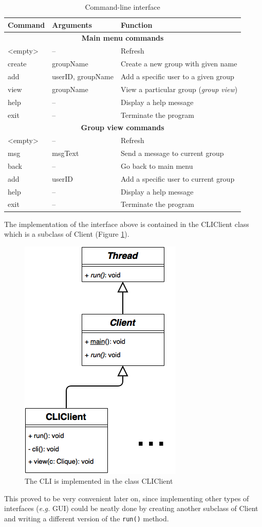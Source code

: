 \documentclass[a4paper, 12pt]{report}
\begin{document}
\begin{table}[H]
\centering
\begin{tabular*}{0.9\textwidth}{l | l | l}
    Command & Arguments & Function \\
    \hline
    \multicolumn{3}{c}{\textbf{Main menu commands}} \\
    \hline
    <empty> & -- & Refresh \\
    create & groupName & Create a new group with given name \\
    add & userID, groupName & Add a specific user to a given group \\
    view & groupName & View a particular group (\emph{group view}) \\
    help & -- & Display a help message \\
    exit & -- & Terminate the program \\
    \hline
    \multicolumn{3}{c}{\textbf{Group view commands}} \\
    \hline 
    <empty> & -- & Refresh \\
    msg & msgText & Send a message to current group \\
    back & -- & Go back to main menu \\
    add & userID & Add a specific user to current group \\
    help & -- & Display a help message \\
    exit & -- & Terminate the program \\ 
\end{tabular*}
\caption{\label{tab:CLI} Command-line interface}
\end{table}
The implementation of the interface above is contained in the CLIClient class which is a subclass of Client (Figure \ref{fig:CLIClient_uml}).
\begin{figure}[H]
\centering
\includegraphics[width = 0.31 \linewidth]{pics/CLIClient_uml.png}
\caption{\label{fig:CLIClient_uml} The CLI is implemented in the class CLIClient}
\end{figure}
This proved to be very convenient later on, since implementing other types of interfaces (\textit{e.g.} GUI) could be neatly done by creating another subclass of Client and writing a different version of the \texttt{run()} method. \\
\end{document}
